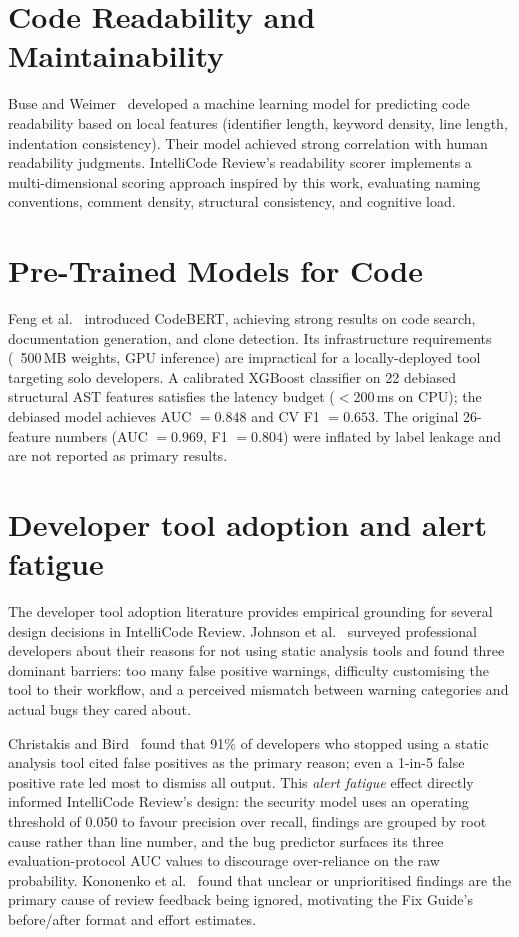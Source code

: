 \documentclass[12pt, oneside]{report}
\begin{document}
\section{Code Readability and Maintainability}
\label{sec:rel-readability}

Buse and Weimer~\cite{buse2010} developed a machine learning model for predicting code
readability based on local features (identifier length, keyword density, line length,
indentation consistency). Their model achieved strong correlation with human readability
judgments. IntelliCode Review's readability scorer implements a multi-dimensional scoring
approach inspired by this work, evaluating naming conventions, comment density, structural
consistency, and cognitive load.

\section{Pre-Trained Models for Code}
\label{sec:rel-pretrained}

Feng et al.~\cite{feng2020} introduced CodeBERT, achieving strong results on code search, documentation generation, and clone detection. Its infrastructure requirements (~500\,MB weights, GPU inference) are impractical for a locally-deployed tool targeting solo developers. A calibrated XGBoost classifier on 22 debiased structural AST features satisfies the latency budget ($<$200\,ms on CPU); the debiased model achieves AUC $= 0.848$ and CV F1 $= 0.653$. The original 26-feature numbers (AUC $= 0.969$, F1 $= 0.804$) were inflated by label leakage and are not reported as primary results.

\section{Developer tool adoption and alert fatigue}
\label{sec:rel-adoption}

The developer tool adoption literature provides empirical grounding for several design
decisions in IntelliCode Review. Johnson et al.~\cite{johnson2013} surveyed professional
developers about their reasons for not using static analysis tools and found three
dominant barriers: too many false positive warnings, difficulty customising the tool to
their workflow, and a perceived mismatch between warning categories and actual bugs they
cared about.

Christakis and Bird~\cite{christakis2016} found that 91\% of developers who stopped using a static analysis tool cited false positives as the primary reason; even a 1-in-5 false positive rate led most to dismiss all output. This \textit{alert fatigue} effect directly informed IntelliCode Review's design: the security model uses an operating threshold of 0.050 to favour precision over recall, findings are grouped by root cause rather than line number, and the bug predictor surfaces its three evaluation-protocol AUC values to discourage over-reliance on the raw probability. Kononenko et al.~\cite{kononenko2016} found that unclear or unprioritised findings are the primary cause of review feedback being ignored, motivating the Fix Guide's before/after format and effort estimates.
\end{document}

